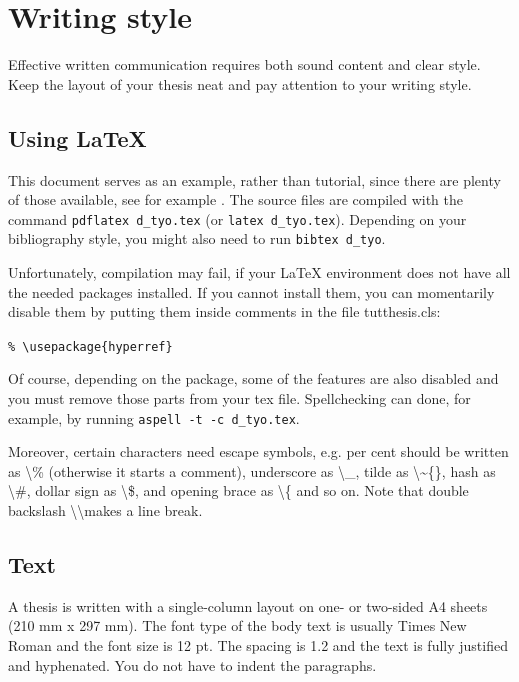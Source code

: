\documentclass[12pt,a4paper,english
]{tunithesis}
\begin{document}
\chapter{Writing style}
\label{ch:style}

Effective written communication requires both sound content and clear
style. Keep the layout of your thesis neat and pay attention to your
writing style.

\section{Using LaTeX}

This document serves as an example, rather than tutorial, since there
are plenty of those available, see for example 
\cite{Dummy:1,oetiker14, latex13}. The source files are compiled
with the command \texttt{pdflatex d\_tyo.tex} (or \texttt{latex
  d\_tyo.tex}). Depending on your bibliography style, you might also
need to run \texttt{bibtex d\_tyo}.

Unfortunately, compilation may fail, if your LaTeX environment does
not have all the needed packages installed. If you cannot install
them, you can momentarily disable them by putting them inside comments
in the file tutthesis.cls:
\begin{center}
\texttt{\% \textbackslash usepackage\{hyperref\}}
\end{center}
Of course, depending on the package, some of the features are also
disabled and you must remove those parts from your tex file.
Spellchecking can done, for example, by running 
\texttt{aspell -t -c d\_tyo.tex}.

Moreover, certain characters need escape symbols, e.g. per cent should
be written as \textbackslash\% (otherwise it starts a comment),
underscore as \textbackslash\_, tilde as \textbackslash\~{}\{\}, hash
as \textbackslash\#, dollar sign as \textbackslash\$, and opening
brace as \textbackslash\{ and so on. Note that double backslash
\textbackslash\textbackslash makes a line break.

\section{Text}
A thesis is written with a single-column layout on one- or two-sided
A4 sheets (210 mm x 297 mm). The font type of the body text is usually
Times New Roman and the font size is 12 pt. The spacing is 1.2 and the
text is fully justified and hyphenated. You do not have to indent the
paragraphs.
\end{document}

